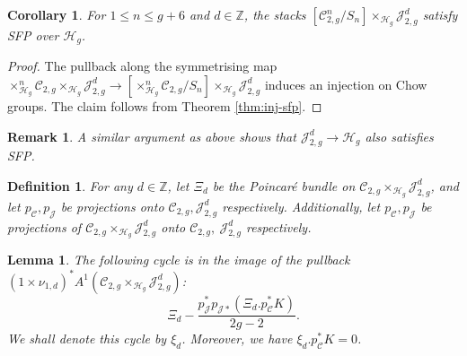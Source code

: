\documentclass[11pt]{amsart}
\newcommand\Z{\mathbb{Z}}
\newtheorem{definition}{Definition}[subsection]
\newtheorem{corollary}{Corollary}[theorem]
\newtheorem{rem}[theorem]{Remark}
\newtheorem{lemma}[theorem]{Lemma}
\theoremstyle{definition}
\newcommand{\ri}{\rightarrow}
\newcommand{\J}{\mathscr{J}}
\newcommand{\jac}{\mathcal{J}}
\newcommand{\h}{\mathcal{H}}
\newcommand{\C}{\mathscr{C}}
\newcommand{\mC}{\mathcal{C}}
\begin{document}
\begin{corollary}\label{cor:sfp-cpj}
	 For $1\leq n\leq g+6$ and $d\in\Z$, the stacks $[\mC_{2,g}^n/S_n]\times_{\h_g}\jac^d_{2,g}$ satisfy SFP over $\h_g$.
\end{corollary}
\begin{proof}
	The pullback along the symmetrising map $\times_{\h_g}^n\mC_{2,g}\times_{\h_g}\jac^d_{2,g}\ri [\times_{\h_g}^n\mC_{2,g}/S_n]\times_{\h_g}\jac^d_{2,g}$ 
	induces an injection on Chow groups. The claim follows from Theorem \ref{thm:inj-sfp}.
\end{proof}
\begin{rem} \label{universal Picard satisfies SFP over hyperelliptic locus}
    A similar argument as above shows that $\mathscr J^d_{2,g}\rightarrow \mathcal H_g$ also satisfies SFP.
\end{rem}
\begin{definition}\label{def:theta-xi}
    For any $d\in\Z$, let $\Xi_d$ be the Poincar\'e bundle on $\mC_{2,g}\times_{\h_g}\J^d_{2,g}$, and let $p_\C,p_\J$ be projections onto $\mC_{2,g},\J^d_{2,g}$ respectively. Additionally, let $p_\mC,p_\jac$ be projections of $\mC_{2,g}\times_{\h_g}\jac^d_{2,g}$ onto $\mC_{2,g}, \ \jac^d_{2,g}$ respectively.
\end{definition}
\begin{lemma}\label{lem:Kxi}
        The following cycle is in the image of the pullback $(1\times\nu_{1,d})^*A^1(\mC_{2,g}\times_{\h_g}\jac^d_{2,g})$:
    $$ \Xi_d-\dfrac{p_{\J}^*p_{\J *}(\Xi_d.p_\C^*K)}{2g-2}.$$
     We shall denote this cycle by $\xi_d$. Moreover, we have $\xi_d.p_\mC^*K = 0$. 
\end{lemma}
\end{document}

